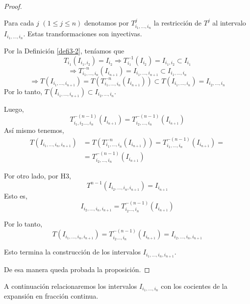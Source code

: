 \documentclass[12pt]{report}
\begin{document}
\begin{proof}
\begin{enumerate}
\begin{itemize}
        Para cada $j$ $(1\leq j\leq n)$ denotamos por $T^{j}_{i_{1},\ldots,i_{n}}$ la restricción de $T^{j}$ al intervalo $I_{i_{1},\ldots,i_{n}}$. Estas transformaciones son inyectivas.
        
        Por la Definición \ref{defi3-2}, teníamos que $$T_{i_{1}}(I_{i_{1},i_{2}})=I_{i_{2}}\Rightarrow T^{-1}_{i_{1}}(I_{i_{2}})=I_{i_{1},i_{2}}\subset I_{i_{1}}$$
        $$
        \Rightarrow T^{-n}_{i_{1},\ldots,i_{n}}(I_{i_{n+1}})=I_{i_{1},\ldots,i_{n+1}}\subset I_{i_{1},\ldots,i_{n}}
        $$
        $$
        \Rightarrow T(I_{i_{1},\ldots,i_{n+1}})=T(T^{-n}_{i_{1},\ldots,i_{n}}(I_{i_{n+1}})) \subset T(I_{i_{1},\ldots,i_{n}})=I_{i_{2},\ldots,i_{n}}
        $$
        Por lo tanto, $T(I_{i_{1},\ldots,i_{n+1}})\subset I_{i_{2},\ldots,i_{n}}$.
        
        Luego,
        $$
        T_{i_{1}, i_{2} \ldots, i_{n}}^{-(n-1)}\left(I_{i_{n+1}}\right)=T_{i_{2}, \ldots, i_{n}}^{-(n-1)}\left(I_{i_{n+1}}\right)
        $$
        Así mismo tenemos,
        $$
        \begin{aligned}
        T\left(I_{i_{1}, \ldots, i_{n}, i_{n+1}}\right) &=T\left(T_{i_{1}, \ldots, i_{n}}^{-n}\left(I_{i_{n+1}}\right)\right)=T_{i_{1}, \ldots, i_{n}}^{-(n-1)}\left(I_{i_{n+1}}\right)=\\
        &=T_{i_{2}, \ldots, i_{n}}^{-(n-1)}\left(I_{i_{n+1}}\right)
        \end{aligned}
        $$
        
        Por otro lado, por H3,
        $$
        T^{n-1}\left(I_{i_{2}, \ldots, i_{n}, i_{n+1}}\right)=I_{i_{n+1}}
        $$
        Esto es,
        $$
        I_{i_{2}, \ldots, i_{n}, i_{n+1}}=T_{i_{2} \ldots, i_{n}}^{-(n-1)}\left(I_{i_{n+1}}\right)
        $$
        
        Por lo tanto,
        $$
        T\left(I_{i_{1}, \ldots, i_{n}, i_{n+1}}\right)=T_{i_{2} \ldots, i_{n}}^{-(n-1)}\left(I_{i_{n+1}}\right)=I_{i_{2}, \ldots, i_{n}, i_{n+1}}
        $$
    \end{itemize}
    Esto termina la construcción de los intervalos $I_{i_{1}, \ldots, i_{n}, i_{n+1}}$.
\end{enumerate}
De esa manera queda probada la proposición.
\end{proof}

A continuación relacionaremos los intervalos $I_{i_{1},\ldots,i_{n}}$ con los cocientes de la expansión en fracción continua.
\end{document}
